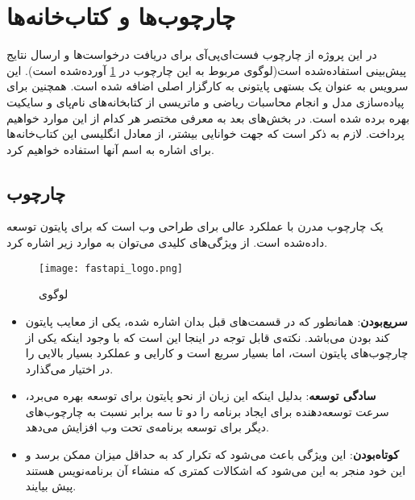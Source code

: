 \section{چارچوب‌ها و کتاب‌خانه‌ها}
در این پروژه از چارچوب فست‌ای‌پی‌آی برای دریافت درخواست‌ها و ارسال نتایج پیش‌بینی استفاده‌شده است(لوگوی مربوط به این چارچوب در \cref{fig:fastapi_logo}\cite{tiangoloFastAPI} آورده‌شده است). این سرویس به عنوان یک بستهی پایتونی به کارگزار اصلی اضافه شده است. همچنین برای پیاده‌سازی مدل و انجام محاسبات ریاضی و ماتریسی از کتابخانه‌های نام‌پای و سایکیت بهره برده شده است. در بخش‌های بعد به معرفی مختصر هر کدام از این موارد خواهیم پرداخت. لازم به ذکر است که جهت خوانایی بیشتر، از معادل انگلیسی این کتاب‌خانه‌ها برای اشاره به اسم آنها استفاده خواهیم کرد.

\subsection{چارچوب }
یک چارچوب مدرن با عملکرد عالی برای طراحی وب است که برای پایتون توسعه داده‌شده است. از ویژگی‌های کلیدی  می‌توان به موارد زیر اشاره کرد\cite{tiangoloFastAPI}.

\begin{figure}[!h]
\centerline{\texttt{[image: fastapi\_logo.png]}}
\caption{لوگوی \cite{tiangoloFastAPI}}
\label{fig:fastapi_logo}
\end{figure}
\begin{itemize}

\item \textbf{سریع‌بودن}: همانطور که در قسمت‌های قبل بدان اشاره شده، یکی از معایب پایتون کند بودن می‌باشد. نکته‌ی قابل توجه در اینجا این است که با وجود اینکه یکی از چارچوب‌های پایتون است، اما  بسیار سریع است و کارایی و عملکرد بسیار بالایی را در اختیار می‌گذارد.

\item \textbf{سادگی توسعه}: بدلیل اینکه این زبان از نحو پایتون برای توسعه بهره می‌برد، سرعت توسعه‌دهنده برای ایجاد برنامه را دو تا سه برابر نسبت به چارچوب‌های دیگر برای توسعه برنامه‌ی تحت وب افزایش می‌دهد.

\item \textbf{کوتاه‌بودن}: این ویژگی باعث می‌شود که تکرار کد به حداقل میزان ممکن برسد و این خود منجر به این می‌شود که اشکالات کمتری که منشاء آن برنامه‌نویس هستند پیش بیایند.

\end{itemize}

